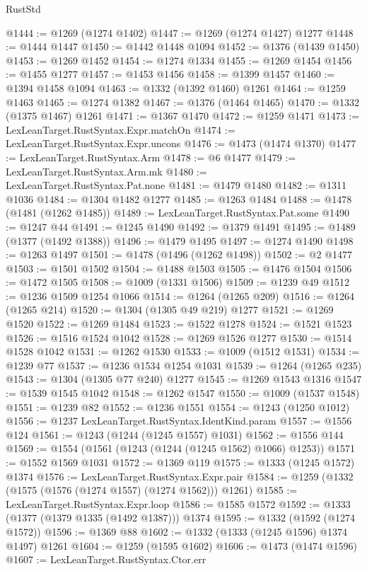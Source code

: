 \begin{lexlean}{RustStd}
\begin{coremodule}
@1444 := @1269 (@1274 @1402)
@1447 := @1269 (@1274 @1427) @1277
@1448 := @1444 @1447
@1450 := @1442 @1448 @1094
@1452 := @1376 (@1439 @1450)
@1453 := @1269 @1452
@1454 := @1274 @1334
@1455 := @1269 @1454
@1456 := @1455 @1277
@1457 := @1453 @1456
@1458 := @1399 @1457
@1460 := @1394 @1458 @1094
@1463 := @1332 (@1392 @1460) @1261
@1464 := @1259 @1463
@1465 := @1274 @1382
@1467 := @1376 (@1464 @1465)
@1470 := @1332 (@1375 @1467) @1261
@1471 := @1367 @1470
@1472 := @1259 @1471
@1473 := LexLeanTarget.RustSyntax.Expr.matchOn
@1474 := LexLeanTarget.RustSyntax.Expr.uncons
@1476 := @1473 (@1474 @1370)
@1477 := LexLeanTarget.RustSyntax.Arm
@1478 := @6 @1477
@1479 := LexLeanTarget.RustSyntax.Arm.mk
@1480 := LexLeanTarget.RustSyntax.Pat.none
@1481 := @1479 @1480
@1482 := @1311 @1036
@1484 := @1304 @1482 @1277
@1485 := @1263 @1484
@1488 := @1478 (@1481 (@1262 @1485))
@1489 := LexLeanTarget.RustSyntax.Pat.some
@1490 := @1247 @44
@1491 := @1245 @1490
@1492 := @1379 @1491
@1495 := @1489 (@1377 (@1492 @1388))
@1496 := @1479 @1495
@1497 := @1274 @1490
@1498 := @1263 @1497
@1501 := @1478 (@1496 (@1262 @1498))
@1502 := @2 @1477
@1503 := @1501 @1502
@1504 := @1488 @1503
@1505 := @1476 @1504
@1506 := @1472 @1505
@1508 := @1009 (@1331 @1506)
@1509 := @1239 @49
@1512 := @1236 @1509 @1254 @1066
@1514 := @1264 (@1265 @209)
@1516 := @1264 (@1265 @214)
@1520 := @1304 (@1305 @49 @219) @1277
@1521 := @1269 @1520
@1522 := @1269 @1484
@1523 := @1522 @1278
@1524 := @1521 @1523
@1526 := @1516 @1524 @1042
@1528 := @1269 @1526 @1277
@1530 := @1514 @1528 @1042
@1531 := @1262 @1530
@1533 := @1009 (@1512 @1531)
@1534 := @1239 @77
@1537 := @1236 @1534 @1254 @1031
@1539 := @1264 (@1265 @235)
@1543 := @1304 (@1305 @77 @240) @1277
@1545 := @1269 @1543 @1316
@1547 := @1539 @1545 @1042
@1548 := @1262 @1547
@1550 := @1009 (@1537 @1548)
@1551 := @1239 @82
@1552 := @1236 @1551
@1554 := @1243 (@1250 @1012)
@1556 := @1237 LexLeanTarget.RustSyntax.IdentKind.param
@1557 := @1556 @124
@1561 := @1243 (@1244 (@1245 @1557) @1031)
@1562 := @1556 @144
@1569 := @1554 (@1561 (@1243 (@1244 (@1245 @1562) @1066) @1253))
@1571 := @1552 @1569 @1031
@1572 := @1369 @119
@1575 := @1333 (@1245 @1572) @1374
@1576 := LexLeanTarget.RustSyntax.Expr.pair
@1584 := @1259 (@1332 (@1575 (@1576 (@1274 @1557) (@1274 @1562))) @1261)
@1585 := LexLeanTarget.RustSyntax.Expr.loop
@1586 := @1585 @1572
@1592 := @1333 (@1377 (@1379 @1335 (@1492 @1387))) @1374
@1595 := @1332 (@1592 (@1274 @1572))
@1596 := @1369 @88
@1602 := @1332 (@1333 (@1245 @1596) @1374 @1497) @1261
@1604 := @1259 (@1595 @1602)
@1606 := @1473 (@1474 @1596)
@1607 := LexLeanTarget.RustSyntax.Ctor.err

\end{coremodule}
\end{lexlean}
